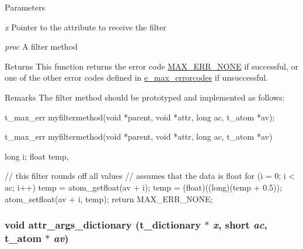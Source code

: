 \begin{DoxyParams}{Parameters}
\item[{\em x}]Pointer to the attribute to receive the filter \item[{\em proc}]A filter method\end{DoxyParams}
\begin{DoxyReturn}{Returns}
This function returns the error code \hyperlink{group__misc_gga0764dd6c02b76cca7d053ae50555d69da6d22f77fef8b1e1b074cef5d29d935fd}{MAX\_\-ERR\_\-NONE} if successful, or one of the other error codes defined in \hyperlink{group__misc_ga0764dd6c02b76cca7d053ae50555d69d}{e\_\-max\_\-errorcodes} if unsuccessful.
\end{DoxyReturn}
\begin{DoxyRemark}{Remarks}
The filter method should be prototyped and implemented as follows: 
\begin{DoxyCode}
    t_max_err myfiltermethod(void *parent, void *attr, long ac, t_atom *av);

    t_max_err myfiltermethod(void *parent, void *attr, long ac, t_atom *av)
    {
        long i;
        float temp,

        // this filter rounds off all values
        // assumes that the data is float 
        for (i = 0; i < ac; i++) {
            temp = atom_getfloat(av + i);
            temp = (float)((long)(temp + 0.5));
            atom_setfloat(av + i, temp);
        }
        return MAX_ERR_NONE;
    }
\end{DoxyCode}
 
\end{DoxyRemark}
\hypertarget{group__attr_gad9de140db1dba2fe588019866a048bc6}{
\subsubsection[{attr\_\-args\_\-dictionary}]{\setlength{\rightskip}{0pt plus 5cm}void attr\_\-args\_\-dictionary ({\bf t\_\-dictionary} $\ast$ {\em x}, \/  short {\em ac}, \/  {\bf t\_\-atom} $\ast$ {\em av})}}
\label{group__attr_gad9de140db1dba2fe588019866a048bc6}


